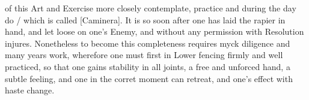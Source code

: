 of this Art and Exercise more closely contemplate,
practice and during the day do / which is called
[Caminera]. It is so
soon after one has laid the rapier in hand, and let loose on one's
Enemy, and without any permission with Resolution injures. Nonetheless
to become this completeness requires myck diligence and many years
work, wherefore one must first in Lower fencing firmly and well
practiced, so that one gains stability in all joints, a free and
unforced hand, a subtle feeling, and one in the corret moment can
retreat, and one's effect with haste change.
